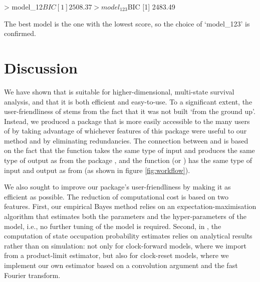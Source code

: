 \begin{example}
> model_12$BIC
    [1] 2508.37
> model_123$BIC
    [1] 2483.49
\end{example}
\noindent
The best model is the one with the lowest score, so the choice of `model\_123' is confirmed. 


\section{Discussion}

We have shown that  is suitable for higher-dimensional, multi-state survival analysis, and that it is both efficient and easy-to-use.  To a significant extent, the user-friendliness of  stems from the fact that it was not built `from the ground up'.  Instead, we produced a package that is more easily accessible to the many users of  by taking advantage of whichever features of this package were useful to our method and by eliminating redundancies. 
The connection between  and  is based on the fact that the function  takes the same type of input and produces the same type of output as  from the package , and the function  (or ) has the same type of input and output as  from  (as shown in figure \ref{fig:workflow}).

We also sought to improve our package's user-friendliness by making it as efficient as possible.  The reduction of computational cost is based on two features. First, our empirical Bayes method relies on an expectation-maximisation algorithm that estimates both the parameters and the hyper-parameters of the model, i.e., no further tuning of the model is required. Second, in , the computation of state occupation probability estimates relies on analytical results rather than on simulation: not only for clock-forward models, where we import from  a product-limit estimator,  but also for clock-reset models, where we implement our own estimator based on a convolution argument and the fast Fourier transform.

